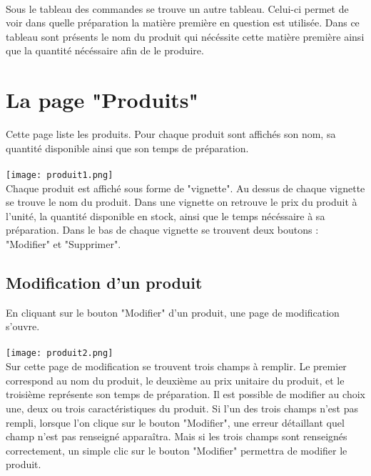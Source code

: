 \paragraph{}
Sous le tableau des commandes se trouve un autre tableau. Celui-ci permet de
voir dans quelle préparation la matière première en question est utilisée. Dans
ce tableau sont présents le nom du produit qui nécéssite cette matière première
ainsi que la quantité nécéssaire afin de le produire.



\section{La page "Produits"}
Cette page liste les produits. Pour chaque produit sont affichés son nom, sa
quantité disponible ainsi que son temps de préparation.

\paragraph{}
\texttt{[image: produit1.png]}\\
Chaque produit est affiché sous forme de "vignette". Au dessus de chaque
vignette se trouve le nom du produit. Dans une vignette on retrouve le prix du
produit à l'unité, la quantité disponible en stock, ainsi que le temps nécéssaire
à sa préparation. Dans le bas de chaque vignette se trouvent deux boutons :
"Modifier" et "Supprimer".

\subsection{Modification d'un produit}
En cliquant sur le bouton "Modifier" d'un produit, une page de modification
s'ouvre.

\paragraph{}
\texttt{[image: produit2.png]}\\
Sur cette page de modification se trouvent trois champs à remplir.
Le premier correspond au nom du produit, le deuxième au prix unitaire du produit,
et le troisième représente son temps de préparation. Il est possible de modifier
au choix une, deux ou trois caractéristiques du produit. Si l'un des trois champs
n'est pas rempli, lorsque l'on clique sur le bouton "Modifier", une erreur
détaillant quel champ n'est pas renseigné apparaîtra. Mais si les trois champs
sont renseignés correctement, un simple clic sur le bouton "Modifier" permettra
de modifier le produit.

